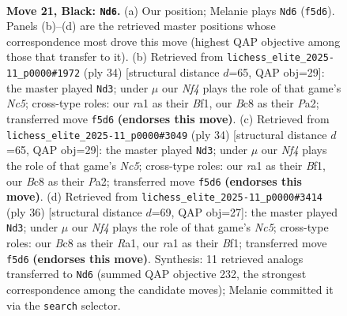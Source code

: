 \documentclass[11pt]{article}
\begin{document}
\clearpage

\begin{figure}[p]\centering
\begin{subfigure}{0.46\textwidth}\centering
\resizebox{\linewidth}{!}{%
\newchessgame
\chessboard[
  setfen={r1b3k1/pppp1pp1/1b3q1p/3P1n2/6B1/2N4P/PPP2PP1/R1B1QK2 b - - 5 21},
  showmover=false,
  pgfstyle=straightmove, color=movearrow, markmove={f5-d6}
]}
\caption{}
\end{subfigure}\hfill
\begin{subfigure}{0.46\textwidth}\centering
\resizebox{\linewidth}{!}{%
\newchessgame
\chessboard[
  setfen={r2q2k1/p1p2pp1/1p1n1b1p/2Np1b2/3P1B2/2P1Q3/PP3PPP/R4BK1 w - - 0 18},
  showmover=false,
  pgfstyle=straightmove, color=movearrow, markmove={c5-d3}
]}
\caption{}
\end{subfigure}
\\[4pt]
\begin{subfigure}{0.46\textwidth}\centering
\resizebox{\linewidth}{!}{%
\newchessgame
\chessboard[
  setfen={r2q2k1/p1p2pp1/1p1n1b1p/2Np1b2/3P1B2/2P1Q3/PP3PPP/R4BK1 w - - 0 18},
  showmover=false,
  pgfstyle=straightmove, color=movearrow, markmove={c5-d3}
]}
\caption{}
\end{subfigure}\hfill
\begin{subfigure}{0.46\textwidth}\centering
\resizebox{\linewidth}{!}{%
\newchessgame
\chessboard[
  setfen={r2q2k1/2p2pp1/1p1n1b1p/p1Np1b2/3P1B2/2P1Q2P/PP3PP1/R4BK1 w - - 0 19},
  showmover=false,
  pgfstyle=straightmove, color=movearrow, markmove={c5-d3}
]}
\caption{}
\end{subfigure}
\caption{\textbf{Move 21, Black: \texttt{Nd6}.} (a) Our position; Melanie plays \texttt{Nd6} (\texttt{f5d6}). Panels (b)--(d) are the retrieved master positions whose correspondence most drove this move (highest QAP objective among those that transfer to it). (b) Retrieved from \texttt{lichess\_elite\_2025-11\_p0000\#1972} (ply 34) [structural distance $d$=65, QAP obj=29]: the master played \texttt{Nd3}; under $\mu$ our \emph{Nf4} plays the role of that game's \emph{Nc5}; cross-type roles: our \emph{r}a1 as their \emph{B}f1, our \emph{B}c8 as their \emph{P}a2; transferred move \texttt{f5d6} \textbf{(endorses this move)}. (c) Retrieved from \texttt{lichess\_elite\_2025-11\_p0000\#3049} (ply 34) [structural distance $d$=65, QAP obj=29]: the master played \texttt{Nd3}; under $\mu$ our \emph{Nf4} plays the role of that game's \emph{Nc5}; cross-type roles: our \emph{r}a1 as their \emph{B}f1, our \emph{B}c8 as their \emph{P}a2; transferred move \texttt{f5d6} \textbf{(endorses this move)}. (d) Retrieved from \texttt{lichess\_elite\_2025-11\_p0000\#3414} (ply 36) [structural distance $d$=69, QAP obj=27]: the master played \texttt{Nd3}; under $\mu$ our \emph{Nf4} plays the role of that game's \emph{Nc5}; cross-type roles: our \emph{B}c8 as their \emph{R}a1, our \emph{r}a1 as their \emph{B}f1; transferred move \texttt{f5d6} \textbf{(endorses this move)}. Synthesis: 11 retrieved analogs transferred to \texttt{Nd6} (summed QAP objective 232, the strongest correspondence among the candidate moves); Melanie committed it via the \texttt{search} selector.}
\label{fig:thought-m41}
\end{figure}
\end{document}
